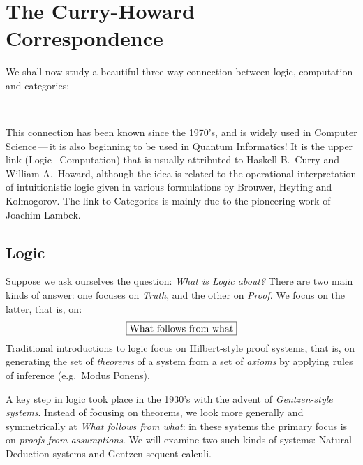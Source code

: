 \documentclass{svmult}
\begin{document}
\section{The Curry-Howard Correspondence}
We shall now study a beautiful three-way connection between logic, computation and categories:
\begin{center}
 \hspace{30mm}%
 \\[10mm]
\hspace{13mm} %
\end{center}
%
This connection has been known since the 1970's, and is widely used in Computer Science\,---\,it is also beginning to be used in Quantum Informatics!
It is the upper link (Logic\,--\,Computation) that is usually attributed to Haskell B.~Curry and William A.~Howard, although the idea is related to  the  operational interpretation of intuitionistic logic  given in various formulations by Brouwer, Heyting and Kolmogorov. The link to Categories is mainly due to the pioneering
work of Joachim Lambek.

\subsection{Logic}
Suppose we ask ourselves the question: \emph{What is Logic about?} There are  two main kinds of answer:  one focuses on \emph{Truth}, and the other
on \emph{Proof}. We focus on the latter, that is, on:
\[ \fbox{What follows from what} \]
%
Traditional introductions to logic focus on Hilbert-style proof systems, that is, on generating the set of \emph{theorems} of a system from a set of
\emph{axioms} by applying rules of inference (e.g.~Modus Ponens).

A key step in logic took place in the 1930's with the advent of \emph{Gentzen-style systems}. Instead of focusing on theorems, we look more generally
and symmetrically at \emph{What follows from what}: in these systems the primary focus is on \emph{proofs from assumptions}.
We will examine two such kinds of systems: Natural Deduction systems and Gentzen sequent calculi.
\end{document}
